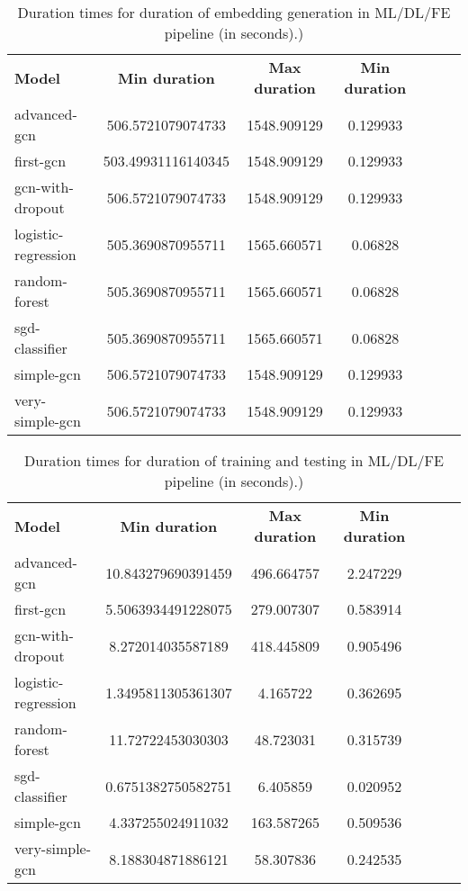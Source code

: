     \begin{table}[H]
        \centering
        \caption{Duration times for duration of embedding generation in ML/DL/FE pipeline (in seconds).)}
        \begin{tabular}{lcccccc}
          \textbf{Model}  & \textbf{Min duration} & \textbf{Max duration} & \textbf{Min duration} \\
            advanced-gcn & 506.5721079074733 & 1548.909129 & 0.129933 \\
            first-gcn & 503.49931116140345 & 1548.909129 & 0.129933 \\
            gcn-with-dropout & 506.5721079074733 & 1548.909129 & 0.129933 \\
            logistic-regression & 505.3690870955711 & 1565.660571 & 0.06828 \\
            random-forest & 505.3690870955711 & 1565.660571 & 0.06828 \\
            sgd-classifier & 505.3690870955711 & 1565.660571 & 0.06828 \\
            simple-gcn & 506.5721079074733 & 1548.909129 & 0.129933 \\
            very-simple-gcn & 506.5721079074733 & 1548.909129 & 0.129933 \\
        \end{tabular}
    \end{table}


    \begin{table}[H]
        \centering
        \caption{Duration times for duration of training and testing in ML/DL/FE pipeline (in seconds).)}
        \begin{tabular}{lcccccc}
          \textbf{Model}  & \textbf{Min duration} & \textbf{Max duration} & \textbf{Min duration} \\
            advanced-gcn & 10.843279690391459 & 496.664757 & 2.247229 \\
            first-gcn & 5.5063934491228075 & 279.007307 & 0.583914 \\
            gcn-with-dropout & 8.272014035587189 & 418.445809 & 0.905496 \\
            logistic-regression & 1.3495811305361307 & 4.165722 & 0.362695 \\
            random-forest & 11.72722453030303 & 48.723031 & 0.315739 \\
            sgd-classifier & 0.6751382750582751 & 6.405859 & 0.020952 \\
            simple-gcn & 4.337255024911032 & 163.587265 & 0.509536 \\
            very-simple-gcn & 8.188304871886121 & 58.307836 & 0.242535 \\
        \end{tabular}
    \end{table}
